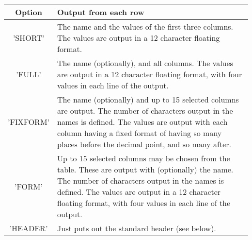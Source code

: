 \begin{small}
{{\begin{tabular}{|c|p{4.5in}|}\hline
   Option   &   Output from each row \\ \hline
  'SHORT'   &  The name and the values of the first three columns.
               The values are output in a 12 character floating format. \\
  'FULL'    &  The name (optionally), and all columns. The values are
               output in a 12 character floating format, with four
               values in each line of the output. \\
  'FIXFORM' &  The name (optionally) and up to 15 selected columns are
               output. The number of characters output in the names is
               defined. The values are output with each column having a
               fixed format of having so many places before the
               decimal point, and so many after. \\
  'FORM'    &  Up to 15 selected columns may be chosen from the table.
               These are output with (optionally) the name. The number
               of characters output in the names is defined. The values
               are output in a 12 character floating format, with four
               values in each line of the output. \\
  'HEADER'  &  Just puts out the standard header (see below). \\ \hline
\end{tabular}

}}
\end{small}
